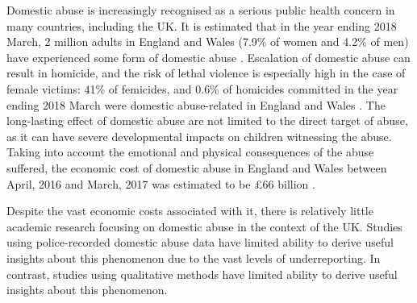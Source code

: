 \documentclass[11pt, a4paper]{article}
\begin{document}
Domestic abuse is increasingly recognised as a serious public health concern in many countries, including the UK. It is estimated that in the year ending 2018 March, 2 million adults in England and Wales (7.9\% of women and 4.2\% of men) have experienced some form of domestic abuse \cite{ONS}. Escalation of domestic abuse can result in homicide, and the risk of lethal violence is especially high in the case of female victims: 41\% of femicides, and 0.6\% of homicides committed in the year ending 2018 March were domestic abuse-related in England and Wales \cite{homic}. The long-lasting effect of domestic abuse are not limited to the direct target of abuse, as it can have severe developmental impacts on children witnessing the abuse. Taking into account the emotional and physical consequences of the abuse suffered, the economic cost of domestic abuse in England and Wales between April, 2016 and March, 2017 was estimated to be \pounds 66 billion \cite{costs}. 

Despite the vast economic costs associated with it, there is relatively little academic research focusing on domestic abuse in the context of the UK. Studies using police-recorded domestic abuse data have limited ability to derive useful insights about this phenomenon due to the vast levels of underreporting. In contrast, studies using qualitative methods have limited ability to derive useful insights about this phenomenon.

\end{document}

